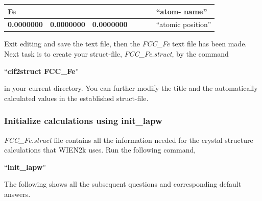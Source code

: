 \documentclass[12 pt]{article}
\begin{document}
\begin{itemize}[leftmargin=0.2in]
\begin{table}[ht]
\begin{tabular}{|l|l|l|l|l|l|l|}
  \textbf{Fe}		&			&			&	&	&		& ``atom-
name''\\ \hline

  \textbf{0.0000000} 	& \textbf{0.0000000} 	& \textbf{0.0000000}	&	&	&		& ``atomic
 position''\\ \hline

  \end{tabular}
  \end{table}

  Exit editing and save the text file, then the \emph{FCC\_Fe} text file has been made. Next task is to create your 
struct-file, \emph{FCC\_Fe.struct}, by the command 

  ``\textbf{cif2struct FCC\_Fe}''

  in your current directory. You can further modify the title and the automatically calculated values in the 
established struct-file.

  \cleardoublepage

	  \end{itemize}

	\subsubsection{Initialize calculations using init\_lapw}

  \emph{FCC\_Fe.struct} file contains all the information needed for the crystal structure calculations that 
WIEN2k uses. Run the following command, 

  ``\textbf{init\_lapw}''

  The following shows all the subsequent questions and corresponding default answers.
\end{document}
